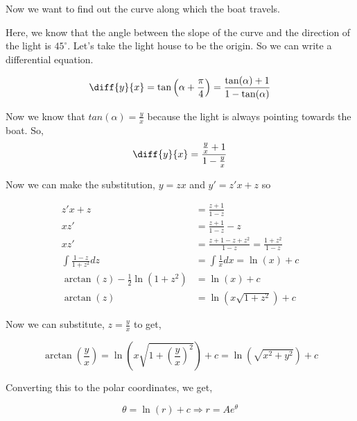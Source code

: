 Now we want to find out the curve along which the boat travels.

Here, we know that the angle between the slope of the curve and the direction of the light is $45^{\circ}$.
Let's take the light house to be the origin.
So we can write a differential equation.

$$ \diff{y}{x} = \tan \left( \alpha + \frac{\pi}{4} \right) = \frac{\tan(\alpha) + 1}{1 - \tan(\alpha)} $$

Now we know that $tan(\alpha) = \frac{y}{x}$ because the light is always pointing towards the boat.
So, 
$$
\diff{y}{x} = \frac{\frac{y}{x} + 1}{1 - \frac{y}{x}}
$$

Now we can make the substitution, $y = zx$ and $y' = z'x + z$ so 

\begin{align*}
z'x + z & = \frac{z+1}{1-z} \\
x z' & = \frac{z+1}{1-z} - z \\
x z' & = \frac{z+1-z+z^2}{1-z} = \frac{1+z^2}{1-z} \\
\int \frac{1-z}{1+z^2} dz & = \int \frac{1}{x} dx = \ln(x) + c \\
\arctan(z) - \frac{1}{2}\ln(1+z^2) & = \ln(x) + c \\ 
\arctan(z) & = \ln( x \sqrt{1+z^2} ) + c
\end{align*}

Now we can substitute, $z = \frac{y}{x}$ to get,

$$
\arctan \left( \frac{y}{x} \right)
= \ln \left( x \sqrt{ 1 + \left( \frac{y}{x} \right)^2 } \right) + c
= \ln(\sqrt{x^2 + y^2}) + c
$$

Converting this to the polar coordinates, we get, 

$$ \theta = \ln(r) + c \Rightarrow  r = Ae^{\theta} $$



